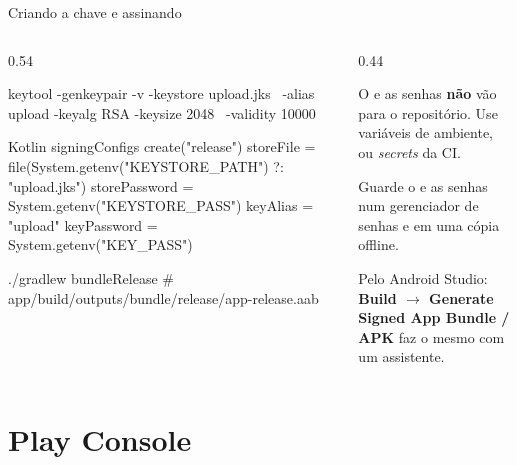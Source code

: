 \documentclass[aspectratio=169,10pt]{beamer}
\begin{document}
\begin{frame}[fragile]{Criando a chave e assinando}
  \begin{columns}[T]
    \begin{column}{0.54\textwidth}
\begin{terminal}[title=Gerando a chave de upload]
keytool -genkeypair -v -keystore upload.jks \
  -alias upload -keyalg RSA -keysize 2048 \
  -validity 10000
\end{terminal}
\begin{codigo}[title=app/build.gradle.kts]{Kotlin}
signingConfigs {
  create("release") {
    storeFile = file(System.getenv("KEYSTORE_PATH")
      ?: "upload.jks")
    storePassword = System.getenv("KEYSTORE_PASS")
    keyAlias = "upload"
    keyPassword = System.getenv("KEY_PASS")
  }
}
\end{codigo}
\begin{terminal}[title=Gerando o App Bundle]
./gradlew bundleRelease
# app/build/outputs/bundle/release/app-release.aab
\end{terminal}
    \end{column}
    \begin{column}{0.44\textwidth}
      \begin{erro}
        O \arq{.jks} e as senhas \textbf{não} vão para o repositório. Use variáveis de ambiente,  ou \emph{secrets} da CI.
      \end{erro}
      \begin{dica}[Backup]
        Guarde o  e as senhas num gerenciador de senhas e em uma cópia offline.
      \end{dica}
      \begin{dica}
        Pelo Android Studio: \textbf{Build $\rightarrow$ Generate Signed App Bundle / APK} faz o mesmo com um assistente.
      \end{dica}
    \end{column}
  \end{columns}
\end{frame}

\section{Play Console}
\end{document}
